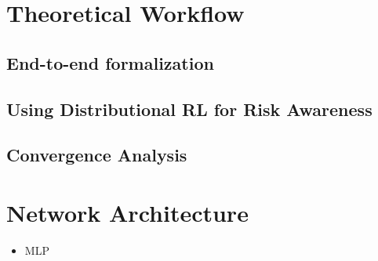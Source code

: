 \section{Theoretical Workflow}

\subsection{End-to-end formalization}

\subsection{Using Distributional RL for Risk Awareness}

\subsection{Convergence Analysis}

\section{Network Architecture}
\begin{itemize}
\item
MLP
\end{itemize}


\def\FormatName#1{#1}

{\footnotesize}


